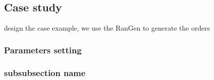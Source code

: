 %     
%     
%     

\subsection{Case study} %
\label{ssub:case_design}
design the case example, we use the RanGen\cite{Demeulemeester2003,Vanhoucke2008} to generate the orders

\subsubsection{Parameters setting} %
\label{ssub:parameters_setting}


\subsubsection{subsubsection name} %
\label{ssub:subsubsection_name}

